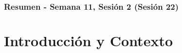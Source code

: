 \documentclass[10pt]{beamer}
\begin{document}
\myfront{}

\begin{frame}
  \titlepage
\end{frame}

\begin{frame}
  \frametitle{Resumen - Semana 11, Sesión 2 (Sesión 22)}
  \tableofcontents
\end{frame}


\section{Introducción y Contexto}
\end{document}
